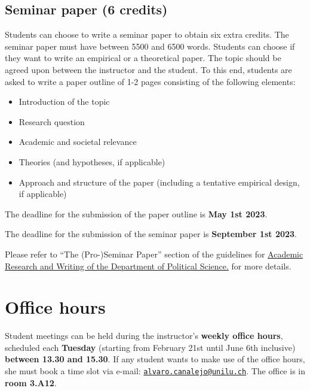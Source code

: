 \documentclass[
  12pt,
]{article}
\begin{document}
\hypertarget{seminar-paper-6-credits}{%
\subsection{Seminar paper (6 credits)}\label{seminar-paper-6-credits}}

Students can choose to write a seminar paper to obtain six extra
credits. The seminar paper must have between 5500 and 6500 words.
Students can choose if they want to write an empirical or a theoretical
paper. The topic should be agreed upon between the instructor and the
student. To this end, students are asked to write a paper outline of 1-2
pages consisting of the following elements:

\begin{itemize}
\item
  Introduction of the topic
\item
  Research question
\item
  Academic and societal relevance
\item
  Theories (and hypotheses, if applicable)
\item
  Approach and structure of the paper (including a tentative empirical
  design, if applicable)
\end{itemize}

The deadline for the submission of the paper outline is \textbf{May 1st
2023}.

The deadline for the submission of the seminar paper is
\textbf{September 1st 2023}.

Please refer to ``The (Pro-)Seminar Paper'' section of the guidelines
for
\href{https://www.unilu.ch/fileadmin/fakultaeten/ksf/institute/polsem/Dok/Studium/2016-Jan_Guidelines_Booklet_engl.pdf}{Academic
Research and Writing of the Department of Political Science.} for more
details.

\hypertarget{office-hours}{%
\section{Office hours}\label{office-hours}}

Student meetings can be held during the instructor's \textbf{weekly
office hours}, scheduled each \textbf{Tuesday} (starting from February
21st until June 6th inclusive) \textbf{between 13.30 and 15.30}. If any
student wants to make use of the office hours, she must book a time slot
via e-mail:
\href{mailto:alvaro.canalejo@unilu.ch}{\nolinkurl{alvaro.canalejo@unilu.ch}}.
The office is in \textbf{room 3.A12}.
\end{document}
